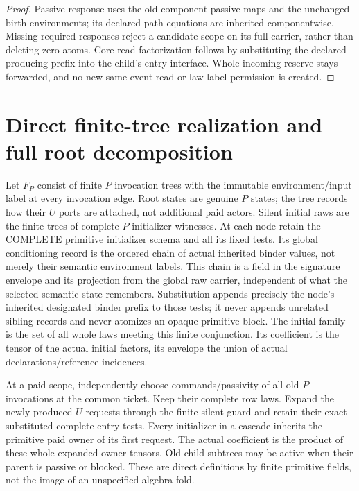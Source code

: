 \documentclass[11pt]{article}
\begin{document}
\begin{proof}
Passive response uses the old component passive maps and the unchanged birth environments; its declared path equations are inherited componentwise. Missing required responses reject a candidate scope on its full carrier, rather than deleting zero atoms. Core read factorization follows by substituting the declared producing prefix into the child's entry interface. Whole incoming reserve stays forwarded, and no new same-event read or law-label permission is created.\end{proof}

\section{Direct finite-tree realization and full root decomposition}
Let $F_P$ consist of finite $P$ invocation trees with the immutable environment/input label at every invocation edge. Root states are genuine $P$ states; the tree records how their $U$ ports are attached, not additional paid actors. Silent initial raws are the finite trees of complete $P$ initializer witnesses. At each node retain the COMPLETE primitive initializer schema and all its fixed tests. Its global conditioning record is the ordered chain of actual inherited binder values, not merely their semantic environment labels. This chain is a field in the signature envelope and its projection from the global raw carrier, independent of what the selected semantic state remembers. Substitution appends precisely the node's inherited designated binder prefix to those tests; it never appends unrelated sibling records and never atomizes an opaque primitive block. The initial family is the set of all whole laws meeting this finite conjunction. Its coefficient is the tensor of the actual initial factors, its envelope the union of actual declarations/reference incidences.

At a paid scope, independently choose commands/passivity of all old $P$ invocations at the common ticket. Keep their complete row laws. Expand the newly produced $U$ requests through the finite silent guard and retain their exact substituted complete-entry tests. Every initializer in a cascade inherits the primitive paid owner of its first request. The actual coefficient is the product of these whole expanded owner tensors. Old child subtrees may be active when their parent is passive or blocked. These are direct definitions by finite primitive fields, not the image of an unspecified algebra fold.
\end{document}
